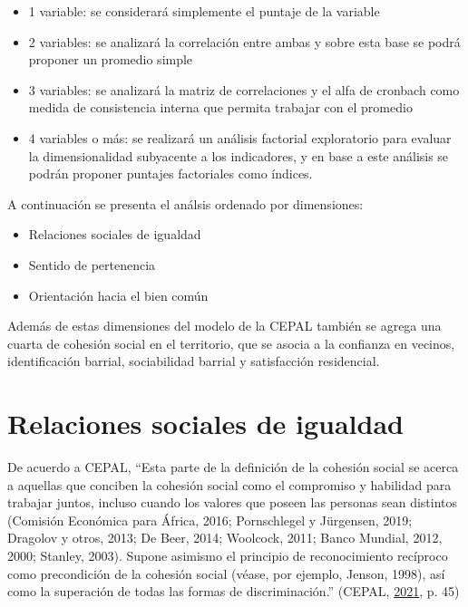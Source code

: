 \documentclass[
  12pt,
]{book}
\providecommand{\tightlist}{%
  \setlength{\itemsep}{0pt}\setlength{\parskip}{0pt}}
\begin{document}
\begin{itemize}
\item
  1 variable: se considerará simplemente el puntaje de la variable
\item
  2 variables: se analizará la correlación entre ambas y sobre esta base se podrá proponer un promedio simple
\item
  3 variables: se analizará la matriz de correlaciones y el alfa de cronbach como medida de consistencia interna que permita trabajar con el promedio
\item
  4 variables o más: se realizará un análisis factorial exploratorio para evaluar la dimensionalidad subyacente a los indicadores, y en base a este análisis se podrán proponer puntajes factoriales como índices.
\end{itemize}

A continuación se presenta el análsis ordenado por dimensiones:

\begin{itemize}
\tightlist
\item
  Relaciones sociales de igualdad
\item
  Sentido de pertenencia
\item
  Orientación hacia el bien común
\end{itemize}

Además de estas dimensiones del modelo de la CEPAL también se agrega una cuarta de cohesión social en el territorio, que se asocia a la confianza en vecinos, identificación barrial, sociabilidad barrial y satisfacción residencial.

\hypertarget{relaciones-sociales-de-igualdad}{%
\section{Relaciones sociales de igualdad}\label{relaciones-sociales-de-igualdad}}

De acuerdo a CEPAL, ``Esta parte de la definición de la cohesión social se acerca a aquellas que conciben la cohesión social como el compromiso y habilidad para trabajar juntos, incluso cuando los valores que poseen las personas sean distintos (Comisión Económica para África, 2016; Pornschlegel y Jürgensen, 2019; Dragolov y otros, 2013; De Beer, 2014; Woolcock, 2011; Banco Mundial, 2012, 2000; Stanley, 2003). Supone asimismo el principio de reconocimiento recíproco como precondición de la cohesión social (véase, por ejemplo, Jenson, 1998), así como la superación de todas las formas de discriminación.'' (CEPAL, \protect\hyperlink{ref-cepal_Cohesion_2021}{2021}, p. 45)
\end{document}
